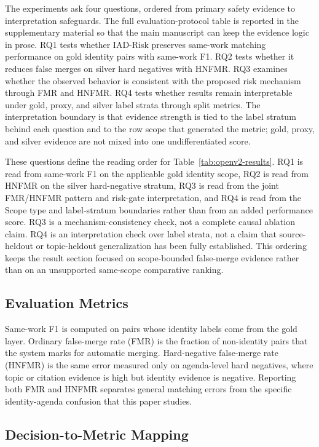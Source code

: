 \documentclass[11pt]{article}
\begin{document}
The experiments ask four questions, ordered from primary safety evidence to interpretation safeguards. The full evaluation-protocol table is reported in the supplementary material so that the main manuscript can keep the evidence logic in prose. RQ1 tests whether IAD-Risk preserves same-work matching performance on gold identity pairs with same-work F1. RQ2 tests whether it reduces false merges on silver hard negatives with HNFMR. RQ3 examines whether the observed behavior is consistent with the proposed risk mechanism through FMR and HNFMR. RQ4 tests whether results remain interpretable under gold, proxy, and silver label strata through split metrics. The interpretation boundary is that evidence strength is tied to the label stratum behind each question and to the row scope that generated the metric; gold, proxy, and silver evidence are not mixed into one undifferentiated score.

These questions define the reading order for Table~\ref{tab:openv2-results}. RQ1 is read from same-work F1 on the applicable gold identity scope, RQ2 is read from HNFMR on the silver hard-negative stratum, RQ3 is read from the joint FMR/HNFMR pattern and risk-gate interpretation, and RQ4 is read from the Scope type and label-stratum boundaries rather than from an added performance score. RQ3 is a mechanism-consistency check, not a complete causal ablation claim. RQ4 is an interpretation check over label strata, not a claim that source-heldout or topic-heldout generalization has been fully established. This ordering keeps the result section focused on scope-bounded false-merge evidence rather than on an unsupported same-scope comparative ranking.

\subsection{Evaluation Metrics}

Same-work F1 is computed on pairs whose identity labels come from the gold layer. Ordinary false-merge rate (FMR) is the fraction of non-identity pairs that the system marks for automatic merging. Hard-negative false-merge rate (HNFMR) is the same error measured only on agenda-level hard negatives, where topic or citation evidence is high but identity evidence is negative. Reporting both FMR and HNFMR separates general matching errors from the specific identity-agenda confusion that this paper studies.

\subsection{Decision-to-Metric Mapping}
\end{document}

